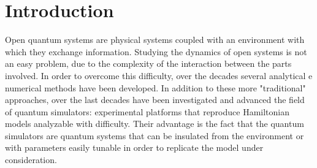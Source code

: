 \chapter*{Introduction}

\label{Introduction}

Open quantum systems are physical systems coupled with an environment with which they exchange information. Studying the dynamics of open systems is not an easy problem, due to the complexity of the interaction between the parts involved. In order to overcome this difficulty, over the decades several analytical e numerical methods have been developed. In addition to these more "traditional" approaches, over the last decades have been investigated and advanced the field of quantum simulators: experimental platforms that reproduce Hamiltonian models analyzable with difficulty. Their advantage is the fact that the quantum simulators are quantum systems that can be insulated from the environment or with parameters easily tunable in order to replicate the model under consideration.

